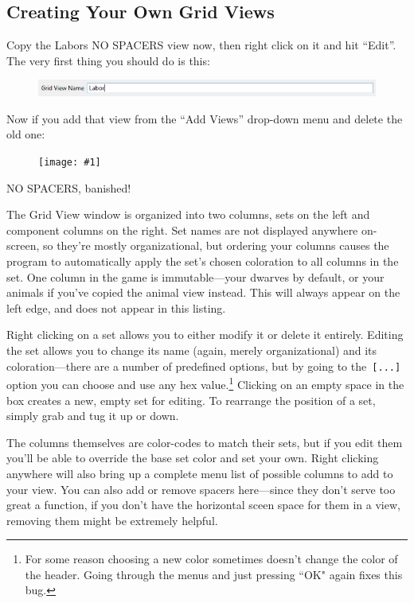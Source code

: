 \documentclass[]{article}
\newcommand{\fullfigure}[1] {
\begin{figure}[h!]
\texttt{[image: \#1]}
\end{figure}
}
\begin{document}
\newpage
\subsection{Creating Your Own Grid Views}
\label{sec:Creating Your Own Grid Views}

Copy the Labors NO SPACERS view now, then right click on it and hit ``Edit''. The very first thing you
should do is this:
\begin{figure}[h!]
\centering
\includegraphics[width=\linewidth]{Sec3Fig15}
\end{figure}

Now if you add that view from the ``Add Views'' drop-down menu and delete the old one:
\fullfigure{Sec3Fig16}

NO SPACERS, banished!

The Grid View window is organized into two columns, sets on the left and
component columns on the right. Set names are not displayed anywhere on-screen, so they're mostly
organizational, but ordering your columns causes the program to automatically apply the set's chosen
coloration to all columns in the set. One column in the game is immutable---your dwarves by default, or
your animals if you've copied the animal view instead. This will always appear on the left edge, and does
not appear in this listing.

Right clicking on a set allows you to either modify it or delete it entirely. Editing the set allows you
to change its name (again, merely organizational) and its coloration---there are a number of predefined
options, but by going to the\texttt{ [...]} option you can choose and use any hex value.\footnote{For
some reason choosing a new color sometimes doesn't change the color of the header. Going through the
menus and just pressing ``OK" again fixes this bug.} Clicking on an empty space in the box creates a new,
empty set for editing. To rearrange the position of a set, simply grab and tug it up or down.

The columns themselves are color-codes to match their sets, but if you edit them you'll be able to
override the base set color and set your own. Right clicking anywhere will also bring up a complete
menu list of possible columns to add to your view. You can also add or remove spacers here---since they
don't serve too great a function, if you don't have the horizontal sceen space for them in a view,
removing them might be extremely helpful.
\end{document}
